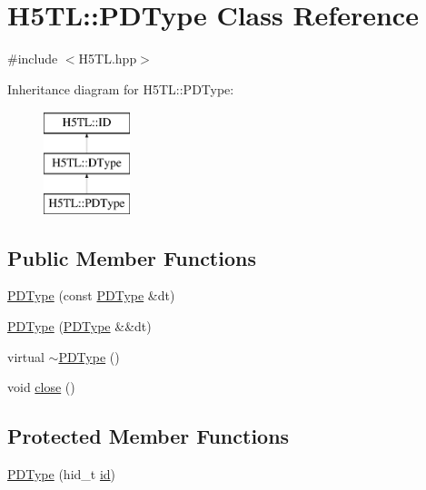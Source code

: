 \hypertarget{class_h5_t_l_1_1_p_d_type}{\section{H5\-T\-L\-:\-:P\-D\-Type Class Reference}
\label{class_h5_t_l_1_1_p_d_type}
}


{\ttfamily \#include $<$H5\-T\-L.\-hpp$>$}

Inheritance diagram for H5\-T\-L\-:\-:P\-D\-Type\-:\begin{figure}[H]
\begin{center}
\leavevmode
\includegraphics[height=3.000000cm]{class_h5_t_l_1_1_p_d_type}
\end{center}
\end{figure}
\subsection*{Public Member Functions}
\begin{DoxyCompactItemize}
\item 
\hyperlink{class_h5_t_l_1_1_p_d_type_a108044a31b27a19222feaaf06e801020}{P\-D\-Type} (const \hyperlink{class_h5_t_l_1_1_p_d_type}{P\-D\-Type} \&dt)
\item 
\hyperlink{class_h5_t_l_1_1_p_d_type_a300306023ca0360e2810732c7779681b}{P\-D\-Type} (\hyperlink{class_h5_t_l_1_1_p_d_type}{P\-D\-Type} \&\&dt)
\item 
virtual \hyperlink{class_h5_t_l_1_1_p_d_type_a6addc1c1ab9e438912b9e3bf65cd6f6a}{$\sim$\-P\-D\-Type} ()
\item 
void \hyperlink{class_h5_t_l_1_1_p_d_type_a85fa032de8ec7be551f92e2115743518}{close} ()
\end{DoxyCompactItemize}
\subsection*{Protected Member Functions}
\begin{DoxyCompactItemize}
\item 
\hyperlink{class_h5_t_l_1_1_p_d_type_a5d84f01f19b6b9adfe0592af6acff6bf}{P\-D\-Type} (hid\-\_\-t \hyperlink{class_h5_t_l_1_1_i_d_ade483b65e8a77310b025e86b11cbc38c}{id})
\end{DoxyCompactItemize}
